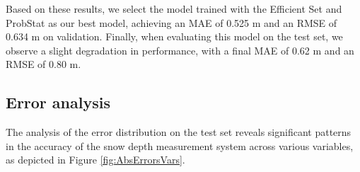 \documentclass[preprint,12pt]{elsarticle}
\begin{document}
Based on these results, we select the model trained with the Efficient Set and ProbStat as our best model, achieving an MAE of 0.525 m and an RMSE of 0.634 m on validation. Finally, when evaluating this model on the test set, we observe a slight degradation in performance, with a final MAE of 0.62 m and an RMSE of 0.80 m.


\subsection{Error analysis}
\label{subsubsec:errordistr}

The analysis of the error distribution on the test set reveals significant patterns in the accuracy of the snow depth measurement system across various variables, as depicted in Figure \ref{fig:AbsErrorsVars}.
\end{document}
